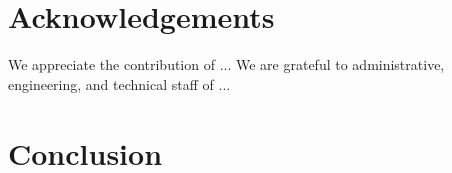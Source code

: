 \section{Acknowledgements}

We appreciate the contribution of ...
We are grateful to administrative, engineering, and technical staff of ...

\section{Conclusion}



